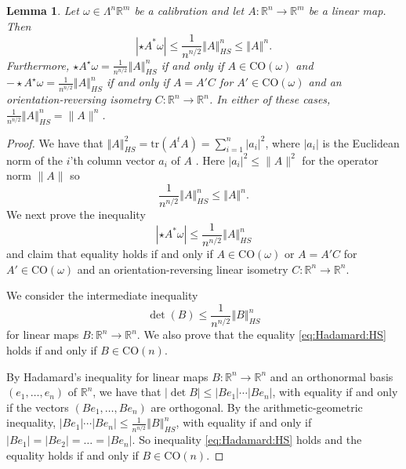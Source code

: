 \documentclass[a4paper,leqno,11pt]{amsart}
\numberwithin{equation}{section}
\newtheorem{lemma}[theorem]{Lemma}
\theoremstyle{remark}
\theoremstyle{remark}
\newcommand{\R}{\mathbb{R}}
\newcommand{\norm}[1]{ \left\Vert #1 \right\Vert }	%
\newcommand{\CO}{\mathrm{CO}}
\begin{document}
\begin{lemma}
\label{lemma:LA}
Let $\omega \in \Lambda^n \R^m$ be a calibration and let $A\colon \R^n \to \R^m$ be a linear map. Then
\[
|\star A^{*} \omega| \le \frac{1}{n^{n/2}} \norm{A}_{HS}^n \leq \norm{A}^n.
\]
Furthermore, $\star A^{\star}\omega = \frac{1}{n^{n/2}} \norm{A}_{HS}^n$ if and only if $A \in \CO( \omega )$ and $- \star A^{\star}\omega = \frac{1}{n^{n/2}} \norm{A}_{HS}^n$ if and only if $A = A' C$ for $A' \in \CO( \omega )$ and an orientation-reversing isometry $C \colon \R^n \to \R^n$. In either of these cases, $\frac{1}{n^{n/2}} \norm{A}_{HS}^n = \|A\|^n$.
\end{lemma}
\begin{proof}
We have that $\norm{A}_{HS}^{2} = \mathrm{tr}( A^t A ) = \sum_{ i = 1 }^{ n } |a_i|^2$, where $|a_i|$ is the Euclidean norm of the $i$'th column vector $a_i$ of $A$ . Here $| a_i |^2 \leq \|A\|^2$ for the operator norm $\|A\|$ so
\begin{equation*}
    \frac{1}{n^{n/2}} \norm{A}_{HS}^n \leq \norm{A}^n.
\end{equation*}
We next prove the inequality 
\begin{equation}\label{eq:Hadamard:HS:calib}
    |\star A^{*} \omega| \le \frac{1}{n^{n/2}} \norm{A}_{HS}^n
\end{equation}
and claim that equality holds if and only if $A \in \CO( \omega )$ or $A = A' C$ for $A' \in \CO( \omega )$ and an orientation-reversing linear isometry $C \colon \R^n \to \R^n$.

We consider the intermediate inequality
\begin{equation}\label{eq:Hadamard:HS}
    \det( B ) \leq \frac{ 1 }{ n^{n/2} }\norm{B}_{HS}^n
\end{equation}
for linear maps $B \colon \R^n \to \R^n$. We also prove that the equality \eqref{eq:Hadamard:HS} holds if and only if $B \in \CO(n)$.

By Hadamard's inequality for linear maps $B \colon \R^n \to \R^n$ and an orthonormal basis $(e_1,\ldots, e_n)$ of $\R^n$, we have that $|\det B| \le |Be_1|\cdots |Be_n|$, with equality if and only if the vectors $( B e_1, \dots, B e_n )$ are orthogonal. By the arithmetic-geometric inequality, $|Be_1|\cdots |Be_n| \le \frac{1}{n^{n/2}} \norm{B}_{HS}^n$, with equality if and only if $| B e_1 | = | B e_2 | = \dots = | B e_n |$. So inequality \eqref{eq:Hadamard:HS} holds and the equality holds if and only if $B \in \CO(n)$.


\end{proof}
\end{document}
